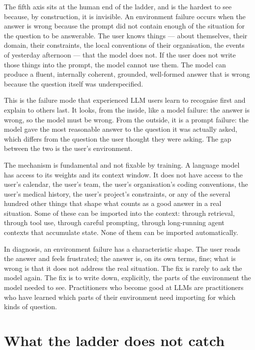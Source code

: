 The fifth axis sits at the human end of the ladder, and is
the hardest to see because, by construction, it is invisible.
An environment failure occurs when the answer is wrong because
the prompt did not contain enough of the situation for the
question to be answerable. The user knows things --- about
themselves, their domain, their constraints, the local
conventions of their organisation, the events of yesterday
afternoon --- that the model does not. If the user does not
write those things into the prompt, the model cannot use
them. The model can produce a fluent, internally coherent,
grounded, well-formed answer that is wrong because the
question itself was underspecified.

This is the failure mode that experienced LLM users learn to
recognise first and explain to others last. It looks, from
the inside, like a model failure: the answer is wrong, so the
model must be wrong. From the outside, it is a prompt
failure: the model gave the most reasonable answer to the
question it was actually asked, which differs from the
question the user thought they were asking. The gap between
the two is the user's environment.

The mechanism is fundamental and not fixable by training. A
language model has access to its weights and its context
window. It does not have access to the user's calendar, the
user's team, the user's organisation's coding conventions,
the user's medical history, the user's project's constraints,
or any of the several hundred other things that shape what
counts as a good answer in a real situation. Some of these
can be imported into the context: through retrieval, through
tool use, through careful prompting, through long-running
agent contexts that accumulate state. None of them can be
imported automatically.

In diagnosis, an environment failure has a characteristic
shape. The user reads the answer and feels frustrated; the
answer is, on its own terms, fine; what is wrong is that it
does not address the real situation. The fix is rarely to ask
the model again. The fix is to write down, explicitly, the
parts of the environment the model needed to see.
Practitioners who become good at LLMs are practitioners who
have learned which parts of their environment need importing
for which kinds of question.

\section{What the ladder does not catch}

